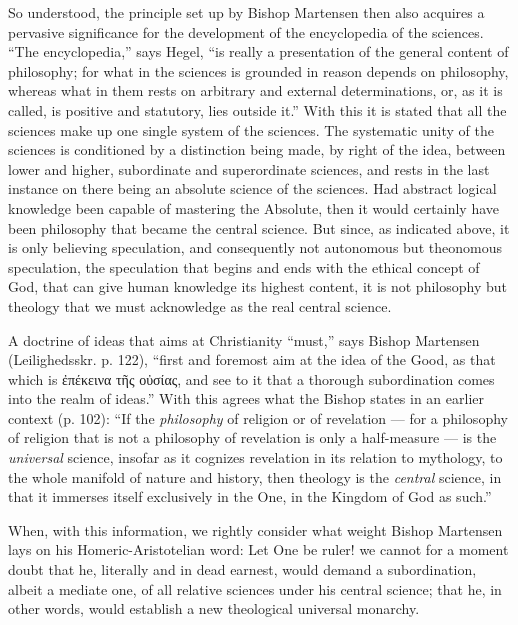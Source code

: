 \documentclass[12pt]{book}
\newcommand{\opage}[1]{\marginnote{\footnotesize\textit{[#1]}}}
\begin{document}
So understood, the principle set up by Bishop Martensen then also acquires a pervasive significance for the development of the encyclopedia of the sciences. ``The encyclopedia,'' says Hegel, ``is really a presentation of the general content of philosophy; for what in the sciences is grounded in reason depends on philosophy, whereas what in them rests on arbitrary and external determinations, or, as it is called, is positive and statutory, lies outside it.'' With this it is stated that all the sciences make up one single system of the sciences. The systematic unity of the sciences is conditioned by a distinction being made, by right of the idea, between lower and higher, subordinate and superordinate sciences, and rests in the last instance on there being an absolute science of the sciences. Had abstract logical knowledge been capable of mastering the Absolute, then it would certainly have been philosophy that became the central science. But since, as indicated above, it is only believing speculation, and consequently not autonomous but theonomous speculation, the speculation that begins and ends with the ethical concept of God, that can give human knowledge its highest content, it is not philosophy but theology that we must acknowledge as the real central science.

\opage{6}\setcounter{footnote}{0}%
A doctrine of ideas that aims at Christianity ``must,'' says Bishop Martensen (Leilighedsskr. p. 122), ``first and foremost aim at the idea of the Good, as that which is ἐπέκεινα τῆς οὐσίας, and see to it that a thorough subordination comes into the realm of ideas.'' With this agrees what the Bishop states in an earlier context (p. 102): ``If the \emph{philosophy} of religion or of revelation --- for a philosophy of religion that is not a philosophy of revelation is only a half-measure --- is the \emph{universal} science, insofar as it cognizes revelation in its relation to mythology, to the whole manifold of nature and history, then theology is the \emph{central} science, in that it immerses itself exclusively in the One, in the Kingdom of God as such.''

When, with this information, we rightly consider what weight Bishop Martensen lays on his Homeric-Aristotelian word: Let One be ruler! we cannot for a moment doubt that he, literally and in dead earnest, would demand a subordination, albeit a mediate one, of all relative sciences under his central science; that he, in other words, would establish a new theological universal monarchy.
\end{document}
